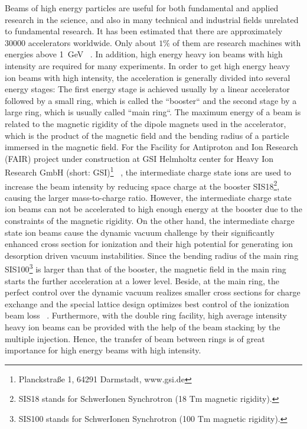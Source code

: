 

Beams of high energy particles are useful for both fundamental and applied research in the science, and also in many technical and industrial fields unrelated to fundamental research. It has been estimated that there are approximately 30000 accelerators worldwide. Only about $1\%$ of them are research machines with energies above \SI{1}{GeV} ~\cite{noauthor_particle_2017}. In addition, high energy heavy ion beams with high intensity are required for many experiments. In order to get high energy heavy ion beams with high intensity, the acceleration is generally divided into several energy stages: The first energy stage is achieved usually by a linear accelerator followed by a small ring, which is called the ``booster`` and the second stage by a large ring, which is usually called ``main ring``.  The maximum energy of a beam is related to the magnetic rigidity of the dipole magnets used in the accelerator, which is the product of the magnetic field and the bending radius of a particle immersed in the magnetic field. For the Facility for Antiproton and Ion Research (\gls{FAIR}) project under construction at \gls{GSI} Helmholtz center for Heavy Ion Research GmbH (short: GSI)\footnote{Planckstra\ss{}e 1, 64291 Darmstadt, www.gsi.de} ~\cite{eschke_international_2005, noauthor_fair_2011}, the intermediate charge state ions are used to increase the beam intensity by reducing space charge at the booster \gls{SIS18}\footnote{SIS18 stands for SchwerIonen Synchrotron (18 Tm magnetic rigidity).}, causing the larger mass-to-charge ratio. However, the intermediate charge state ion beams can not be accelerated to high enough energy at the booster due to the constraints of the magnetic rigidity. On the other hand, the intermediate charge state ion beams cause the dynamic vacuum challenge by their significantly enhanced cross section for ionization and their high potential for generating ion desorption driven vacuum instabilities. Since the bending radius of the main ring \gls{SIS100}\footnote{SIS100 stands for SchwerIonen Synchrotron (100 Tm magnetic rigidity).} is larger than that of the booster, the magnetic field in the main ring starts the further acceleration at a lower level. Beside, at the main ring, the perfect control over the dynamic vacuum realizes smaller cross sections for charge exchange and the special lattice design optimizes best control of the ionization beam loss ~\cite{spiller_technologies_2016}. Furthermore, with the double ring facility, high average intensity heavy ion beams can be provided with the help of the beam stacking by the multiple injection. Hence, the transfer of beam between rings is of great importance for high energy beams with high intensity.





